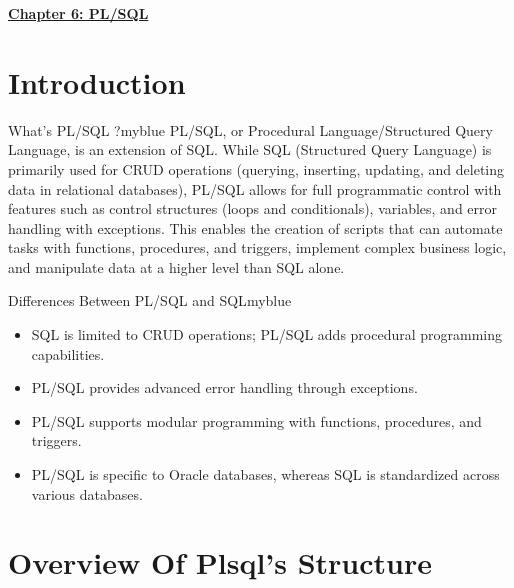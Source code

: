 \newpage 
\null 
\vspace{0.15cm}

\begin{center} 
\Huge{\textbf{\underline{Chapter 6: PL/SQL}}}

\end{center}

\setcounter{section}{0}

\vspace{0.35cm}

\section{Introduction}

\begin{prettyBox}{What's PL/SQL ?}{myblue}
PL/SQL, or Procedural Language/Structured Query Language, is an extension of SQL. While SQL (Structured Query Language) is primarily used for CRUD operations (querying, inserting, updating, and deleting data in relational databases), PL/SQL allows for full programmatic control with features such as control structures (loops and conditionals), variables, and error handling with exceptions. This enables the creation of scripts that can automate tasks with functions, procedures, and triggers, implement complex business logic, and manipulate data at a higher level than SQL alone.
\end{prettyBox}

\vspace{0.25cm}

\begin{prettyBox}{Differences Between PL/SQL and SQL}{myblue}
\begin{itemize}
    \item SQL is limited to CRUD operations; PL/SQL adds procedural programming capabilities.
    \item PL/SQL provides advanced error handling through exceptions.
    \item PL/SQL supports modular programming with functions, procedures, and triggers.
    \item PL/SQL is specific to Oracle databases, whereas SQL is standardized across various databases.
\end{itemize} 
\end{prettyBox}

\vspace{0.5cm}

\section{Overview Of Plsql's Structure}

